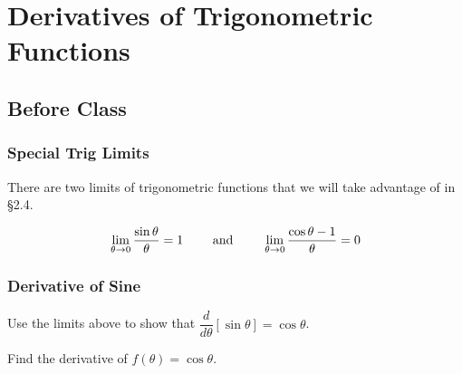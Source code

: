 \documentclass[notes]{subfiles}
\begin{document}
	\fancyhead[LO,RE]{\bfseries \currentname}
	\fancyfoot[C]{{}}
	\fancyfoot[RO,LE]{\large \thepage}	%
	
\section*{Derivatives of Trigonometric Functions}\label{cs24}
	\subsection*{Before Class}
	\subsubsection*{Special Trig Limits}
		There are two limits of trigonometric functions that we will take advantage of in \S2.4.  
		\begin{rmk}
			\[\displaystyle \lim_{\theta\to 0} \dfrac{\sin \theta}{\theta} = 1\qquad\text{ and }\qquad \displaystyle \lim_{\theta\to 0} \dfrac{\cos \theta - 1}{\theta} = 0\]
		\end{rmk}
		\begin{pf}
			
		\end{pf}
			\newpage
	\subsubsection*{Derivative of Sine}
		\begin{ex}
			Use the limits above to show that $\dfrac{d}{d\theta}\left[\sin \theta\right] = \cos \theta$.
		\end{ex}	
	
		\begin{ex}
			Find the derivative of $f(\theta) = \cos \theta$.
		\end{ex}
			\newpage
			
\end{document}
